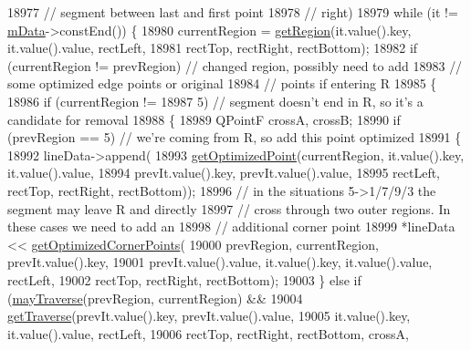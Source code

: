 \begin{DoxyCode}
{18977                                    \textcolor{comment}{// segment between last and first point}
18978                                    \textcolor{comment}{// right)}
18979   \textcolor{keywordflow}{while} (it != \hyperlink{class_q_c_p_curve_a88d533e455bca96004b049e99168731b}{mData}->constEnd()) \{
18980     currentRegion = \hyperlink{class_q_c_p_curve_a3af3183f35bd7aebe149f29ae4f1034a}{getRegion}(it.value().key, it.value().value, rectLeft,
18981                               rectTop, rectRight, rectBottom);
18982     \textcolor{keywordflow}{if} (currentRegion != prevRegion) \textcolor{comment}{// changed region, possibly need to add}
18983                                      \textcolor{comment}{// some optimized edge points or original}
18984                                      \textcolor{comment}{// points if entering R}
18985     \{
18986       \textcolor{keywordflow}{if} (currentRegion !=
18987           5) \textcolor{comment}{// segment doesn't end in R, so it's a candidate for removal}
18988       \{
18989         QPointF crossA, crossB;
18990         \textcolor{keywordflow}{if} (prevRegion == 5) \textcolor{comment}{// we're coming from R, so add this point optimized}
18991         \{
18992           lineData->append(
18993               \hyperlink{class_q_c_p_curve_acbcfea8986dde6c0143e3f7e8e76041d}{getOptimizedPoint}(currentRegion, it.value().key, it.value().value,
18994                                 prevIt.value().key, prevIt.value().value,
18995                                 rectLeft, rectTop, rectRight, rectBottom));
18996           \textcolor{comment}{// in the situations 5->1/7/9/3 the segment may leave R and directly}
18997           \textcolor{comment}{// cross through two outer regions. In these cases we need to add an}
18998           \textcolor{comment}{// additional corner point}
18999           *lineData << \hyperlink{class_q_c_p_curve_aad0b69d9a7a2a5367fcc9fe3edaf9bf4}{getOptimizedCornerPoints}(
19000               prevRegion, currentRegion, prevIt.value().key,
19001               prevIt.value().value, it.value().key, it.value().value, rectLeft,
19002               rectTop, rectRight, rectBottom);
19003         \} \textcolor{keywordflow}{else} \textcolor{keywordflow}{if} (\hyperlink{class_q_c_p_curve_ae5b232c8201441a940516c745309a685}{mayTraverse}(prevRegion, currentRegion) &&
19004                    \hyperlink{class_q_c_p_curve_ab4ffdf3d62d5bd3a187f6668daf01f85}{getTraverse}(prevIt.value().key, prevIt.value().value,
19005                                it.value().key, it.value().value, rectLeft,
19006                                rectTop, rectRight, rectBottom, crossA,
}
\end{DoxyCode}
